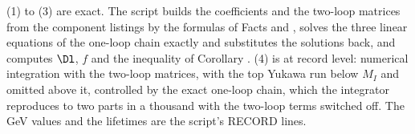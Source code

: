 (1) to (3) are exact. The script builds the coefficients and the two-loop matrices from the component listings by the formulas of Facts  and , solves the three linear equations of the one-loop chain exactly and substitutes the solutions back, and computes $\Dl$, $f$ and the inequality of Corollary . (4) is at record level: numerical integration with the two-loop matrices, with the top Yukawa run below $M_{I}$ and omitted above it, controlled by the exact one-loop chain, which the integrator reproduces to two parts in a thousand with the two-loop terms switched off. The GeV values and the lifetimes are the script's RECORD lines.
